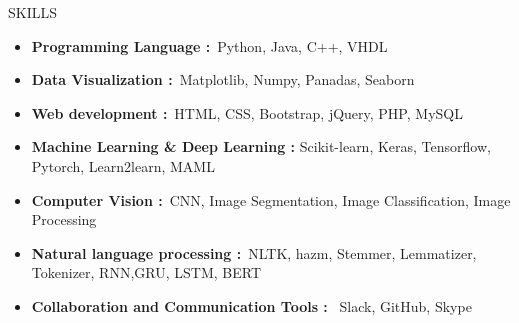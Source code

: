 \documentclass[]{CV}
\begin{document}
\vspace{-4mm}
\begin{section}{SKILLS}
    \begin{itemize}
        \item \textbf{Programming Language :}~Python, Java, C++, VHDL
        \item \textbf{Data Visualization :}~Matplotlib, Numpy, Panadas, Seaborn
        \item \textbf{Web development :}~HTML, CSS, Bootstrap, jQuery, PHP,  MySQL
        \item \textbf{Machine Learning \& Deep Learning :} Scikit-learn, Keras, Tensorflow, Pytorch, Learn2learn, MAML
        \item \textbf{Computer Vision :}~CNN, Image Segmentation, Image Classification, Image Processing
        \item \textbf{Natural language processing :}~NLTK, hazm, Stemmer, Lemmatizer, Tokenizer, RNN,GRU, LSTM, BERT
        \item \textbf{Collaboration and Communication Tools : }~Slack, GitHub, Skype
    \end{itemize}
\end{section}
\end{document}
